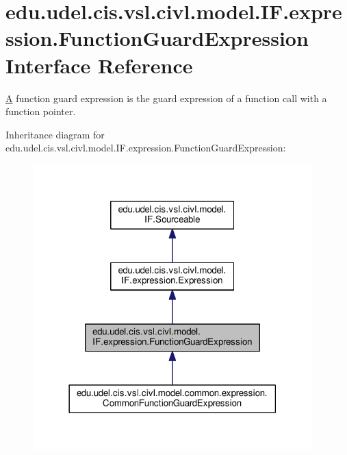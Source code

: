 \hypertarget{interfaceedu_1_1udel_1_1cis_1_1vsl_1_1civl_1_1model_1_1IF_1_1expression_1_1FunctionGuardExpression}{}\section{edu.\+udel.\+cis.\+vsl.\+civl.\+model.\+I\+F.\+expression.\+Function\+Guard\+Expression Interface Reference}
\label{interfaceedu_1_1udel_1_1cis_1_1vsl_1_1civl_1_1model_1_1IF_1_1expression_1_1FunctionGuardExpression}


\hyperlink{structA}{A} function guard expression is the guard expression of a function call with a function pointer.  




Inheritance diagram for edu.\+udel.\+cis.\+vsl.\+civl.\+model.\+I\+F.\+expression.\+Function\+Guard\+Expression\+:
\nopagebreak
\begin{figure}[H]
\begin{center}
\leavevmode
\includegraphics[width=306pt]{interfaceedu_1_1udel_1_1cis_1_1vsl_1_1civl_1_1model_1_1IF_1_1expression_1_1FunctionGuardExpression__inherit__graph}
\end{center}
\end{figure}



